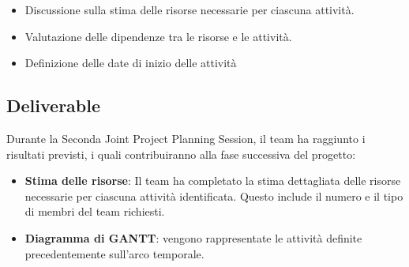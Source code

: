 \begin{itemize}
    \item Discussione sulla stima delle risorse necessarie per ciascuna attività.
    \item Valutazione delle dipendenze tra le risorse e le attività.
    \item Definizione delle date di inizio delle attività
\end{itemize}

\subsection{Deliverable}

Durante la Seconda Joint Project Planning Session, il team ha raggiunto i risultati previsti, i quali contribuiranno alla fase successiva del progetto:

\begin{itemize}
    \item \textbf{Stima delle risorse}: Il team ha completato la stima dettagliata delle risorse necessarie per ciascuna attività identificata. Questo include il numero e il tipo di membri del team richiesti.
    \item \textbf{Diagramma di GANTT}: vengono rappresentate le attività definite precedentemente sull'arco temporale.
\end{itemize}

